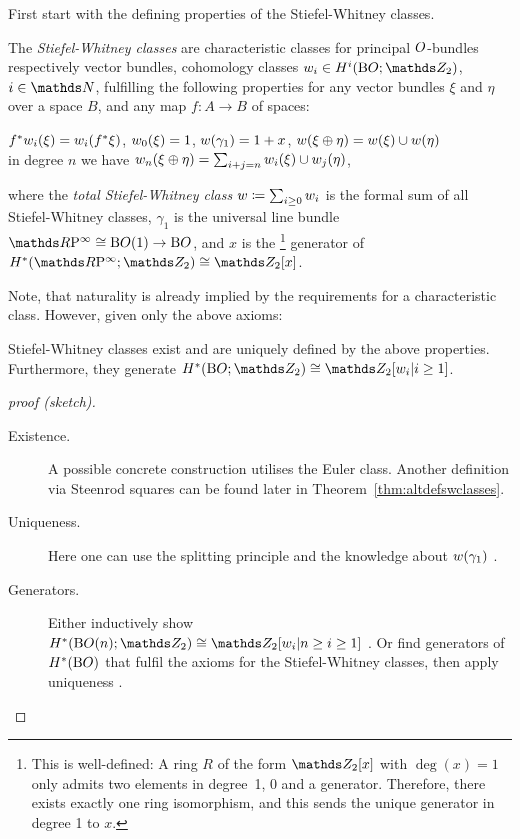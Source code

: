 First start with the defining properties of the Stiefel-Whitney
classes.
\begin{Def}\label{def:swclasses}
  The \emph{Stiefel-Whitney classes} are
  characteristic classes for principal $O$-bundles
  respectively vector bundles,
  \idest cohomology classes
  $\ws{i}\in \H^i(\BO;\Zmod2)$, $i\in\Nat$,
  fulfilling the following properties for any vector bundles $\xi$ and
  $\eta$ over a space $B$, and any map $f\colon A\to B$ of spaces:
  \begin{axioms}
  \axiom[Naturality] ${f}^*{w_{i}}(\xi) = {w_{i}}({f}^* \xi)$,
  \axiom ${w_{0}}(\xi)=1$,
  \axiom ${w}(\gamma_1) = 1 + x$,
  \axiom[Multiplicativity]\label{tag:swclassesmultiplicativity}
  ${w}(\xi \oplus \eta) = {w}(\xi)\cup {w}(\eta)$
    \\\idest in degree $n$ we have
    ${w_{n}}(\xi\oplus\eta) = \sum_{i+j=n}{w_{i}}(\xi) \cup {w_{j}}(\eta)$,
  \end{axioms}
  where the \emph{total Stiefel-Whitney class}
  $w\coloneqq\sum_{i\geq 0}w_{i}$ is the formal sum of all
  Stiefel-Whitney classes,
  $\gamma_1$ is the universal line bundle $\RPinf\cong\BO(1)\to\BO$,
  and $x$ is the%
  \footnote{
    This is well-defined: A ring $R$ of the form $\Zmod2[x]$
    with $\deg(x)=1$ only admits two elements in degree~1, $0$ and a
    generator. Therefore, there exists exactly one ring
    isomorphism, and this sends the unique generator in
    degree 1 to $x$.
  }
  generator of $\H^*(\RPinf;\Zmod2)\cong\Zmod2[x]$.
\end{Def}
Note, that naturality is already implied by the requirements for a
characteristic class. However, given only the above axioms:
\begin{Thm}
  Stiefel-Whitney classes exist and are uniquely defined by the above
  properties. Furthermore, they generate $\H^*(\BO;\Zmod2)\cong \Zmod2[\ws{i}|i\geq1]$.
  \begin{proof}[proof (sketch)]
    \begin{description}
    \item[Existence.]
      A possible concrete construction utilises the Euler
      class. Another definition via Steenrod squares can be 
      found later in Theorem~\ref{thm:altdefswclasses}.
    \item[Uniqueness.]
      Here one can use the splitting principle and the knowledge about
      ${w}(\gamma_1)$
      \cite[Uniqueness Theorem~7.3]{milnor}.
    \item[Generators.]
      Either inductively show
      $\H^*(\BO(n);\Zmod2)\cong \Zmod2[\ws{i}|n\geq i\geq1]$
      \cite[Theorem~7.1~ff.]{milnor}.
      Or find generators of $H^*(\mathrm{B}O)$ that fulfil the axioms for
      the Stiefel-Whitney classes, then apply uniqueness
      \cite[Chap.~7.6]{may}.
      \qedhere
    \end{description}
  \end{proof}
\end{Thm}

